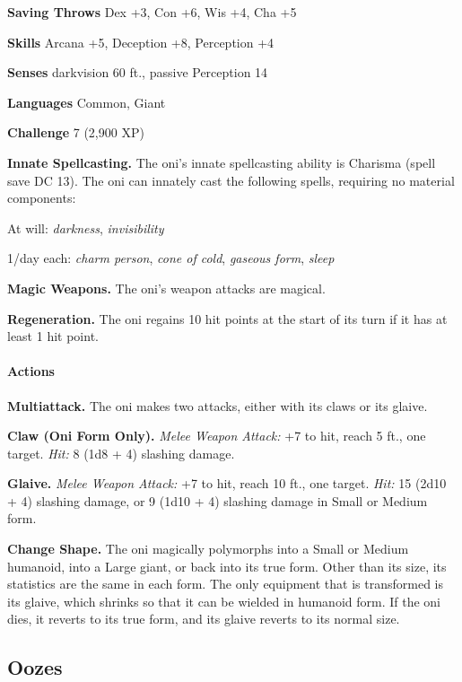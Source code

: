 \documentclass[
]{article}
\begin{document}
\textbf{Saving Throws} Dex +3, Con +6, Wis +4, Cha +5

\textbf{Skills} Arcana +5, Deception +8, Perception +4

\textbf{Senses} darkvision 60 ft., passive Perception 14

\textbf{Languages} Common, Giant

\textbf{Challenge} 7 (2,900 XP)

\textbf{Innate Spellcasting.} The oni's innate spellcasting ability is
Charisma (spell save DC 13). The oni can innately cast the following
spells, requiring no material components:

At will: \emph{darkness}, \emph{invisibility}

1/day each: \emph{charm person}, \emph{cone of cold}, \emph{gaseous
form}, \emph{sleep}

\textbf{Magic Weapons.} The oni's weapon attacks are magical.

\textbf{Regeneration.} The oni regains 10 hit points at the start of its
turn if it has at least 1 hit point.

\hypertarget{actions-1}{%
\paragraph{Actions}\label{actions-1}}

\textbf{Multiattack.} The oni makes two attacks, either with its claws
or its glaive.

\textbf{Claw (Oni Form Only).} \emph{Melee Weapon Attack:} +7 to hit,
reach 5 ft., one target. \emph{Hit:} 8 (1d8 + 4) slashing damage.

\textbf{Glaive.} \emph{Melee Weapon Attack:} +7 to hit, reach 10 ft.,
one target. \emph{Hit:} 15 (2d10 + 4) slashing damage, or 9 (1d10 + 4)
slashing damage in Small or Medium form.

\textbf{Change Shape.} The oni magically polymorphs into a Small or
Medium humanoid, into a Large giant, or back into its true form. Other
than its size, its statistics are the same in each form. The only
equipment that is transformed is its glaive, which shrinks so that it
can be wielded in humanoid form. If the oni dies, it reverts to its true
form, and its glaive reverts to its normal size.

\hypertarget{oozes}{%
\subsection{Oozes}\label{oozes}}
\end{document}
